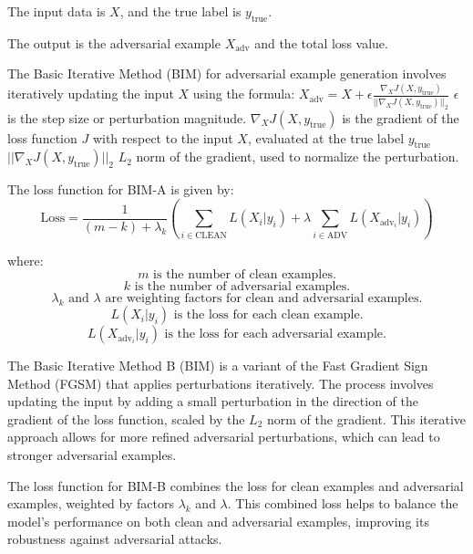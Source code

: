The input data is \(X\), and the true label is \(y_{\text{true}}\).

The output is the adversarial example \(X_{\text{adv}}\) and the total loss value.

The Basic Iterative Method (BIM) for adversarial example generation involves iteratively updating the input \(X\) using the formula:
$X_{\text{adv}} = X + \epsilon \frac{\nabla_X J(X, y_{\text{true}})}{||\nabla_X J(X, y_{\text{true}})||_2}$
$\epsilon$ is the step size or perturbation magnitude.
$\nabla_X J(X, y_{\text{true}})$ is the gradient of the loss function $J$ with respect to the input $X$, evaluated at the true label $y_{\text{true}}$
$||\nabla_X J(X, y_{\text{true}})||_2$  $L_2$ norm of the gradient, used to normalize the perturbation.

The loss function for BIM-A is given by:
\begin{equation*}
\text{Loss} = \frac{1}{{(m - k)} + \lambda_k} \left( \sum_{i \in \text{CLEAN}} L(X_i | y_i) + \lambda \sum_{i \in \text{ADV}} L(X_{\text{adv}_i} | y_i) \right)
\end{equation*}

where:
\begin{equation*}
m \text{ is the number of clean examples.}
\end{equation*}
\begin{equation*}
k \text{ is the number of adversarial examples.}
\end{equation*}
\begin{equation*}
\lambda_k \text{ and } \lambda \text{ are weighting factors for clean and adversarial examples.}
\end{equation*}
\begin{equation*}
L(X_i | y_i) \text{ is the loss for each clean example.}
\end{equation*}
\begin{equation*}
L(X_{\text{adv}_i} | y_i) \text{ is the loss for each adversarial example.}
\end{equation*}

The Basic Iterative Method B (BIM) is a variant of the Fast Gradient Sign Method (FGSM) that applies perturbations iteratively. The process involves updating the input by adding a small perturbation in the direction of the gradient of the loss function, scaled by the $L_2$ norm of the gradient. This iterative approach allows for more refined adversarial perturbations, which can lead to stronger adversarial examples.

The loss function for BIM-B combines the loss for clean examples and adversarial examples, weighted by factors $\lambda_k$ and $\lambda$. This combined loss helps to balance the model's performance on both clean and adversarial examples, improving its robustness against adversarial attacks.
